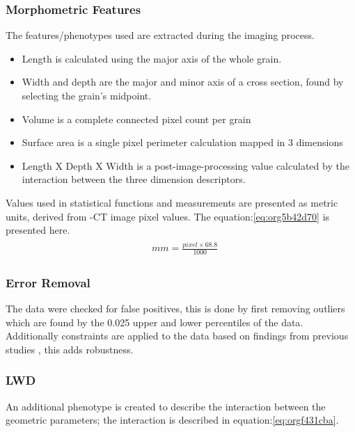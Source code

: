 \documentclass[a4paper, twocolumn]{article}
\begin{document}
\subsubsection{Morphometric Features}
\label{sec:org9656138}

The features/phenotypes used are extracted during the imaging process.

\begin{itemize}
\item Length is calculated using the major axis of the whole grain.
\item Width and depth are the major and minor axis of a cross section, found by selecting the grain's midpoint.
\item Volume is a complete connected pixel count per grain
\item Surface area is a single pixel perimeter calculation mapped in 3 dimensions
\item Length X Depth X Width is a post-image-processing value calculated by the interaction between the three dimension descriptors.
\end{itemize}

Values used in statistical functions and measurements are presented as metric units, derived from \textmu{}-CT image pixel values. The equation:\ref{eq:org5b42d70} is presented here.
\begin{align}
\label{eq:org5b42d70}
  &\begin{aligned}
mm = \frac{pixel \times 68.8}{1000}
  \end{aligned}
\end{align}

\subsubsection{Error Removal}
\label{sec:org026fc5b}
The data were checked for false positives, this is done by first removing outliers which are found by the 0.025 upper and lower percentiles of the data. Additionally constraints are applied to the data based on findings from previous studies \cite{Hughes2017}, this adds robustness.

\subsubsection{LWD}
\label{sec:orge8f4a46}
An additional phenotype is created to describe the interaction between the geometric parameters; the interaction is described in equation:\ref{eq:orgf431cba}.
\end{document}
